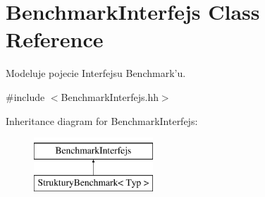 \hypertarget{class_benchmark_interfejs}{\section{Benchmark\-Interfejs Class Reference}
\label{class_benchmark_interfejs}
}


Modeluje pojecie Interfejsu Benchmark'u.  




{\ttfamily \#include $<$Benchmark\-Interfejs.\-hh$>$}

Inheritance diagram for Benchmark\-Interfejs\-:\begin{figure}[H]
\begin{center}
\leavevmode
\includegraphics[height=2.000000cm]{class_benchmark_interfejs}
\end{center}
\end{figure}

